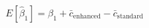 \documentclass[border=1pt]{standalone}
\begin{document}
$\displaystyle E[\widehat{\beta}_1]=\beta_1+\bar c_{\text{enhanced}}-\bar c_{\text{standard}}$
\end{document}
